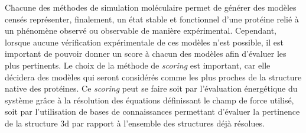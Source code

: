 Chacune des méthodes de simulation moléculaire permet de générer des modèles censés représenter, finalement, un état stable et fonctionnel d'une protéine relié à un phénomène observé ou observable de manière expérimental. Cependant, lorsque aucune vérification expérimentale de ces modèles n'est possible, il est important de pouvoir donner un score à chacun des modèles afin d'évaluer les plus pertinents. Le choix de la méthode de \textit{scoring} est important, car elle décidera des modèles qui seront considérés comme les plus proches de la structure native des protéines. Ce \textit{scoring} peut se faire soit par l'évaluation énergétique du système grâce à la résolution des équations définissant le champ de force utilisé, soit par l'utilisation de bases de connaissances permettant d'évaluer la pertinence de la structure 3d par rapport à l'ensemble des structures déjà résolues.

